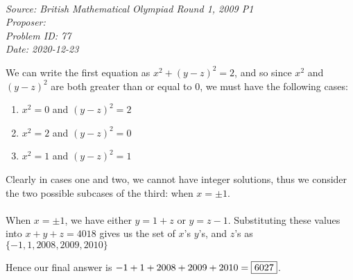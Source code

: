 \SSbreak\\
\emph{Source: British Mathematical Olympiad Round 1, 2009 P1}\\
\emph{Proposer: \Pss}\\
\emph{Problem ID: 77}\\
\emph{Date: 2020-12-23}\\
\SSbreak

\bigskip

\begin{solution}\hfil\medskip

We can write the first equation as \(x^2+(y-z)^2=2\), and so since \(x^2\) and \((y-z)^2\) are both greater than or equal to 0, we must have the following cases:

\begin{enumerate}
    \item \(x^2=0\) and \((y-z)^2=2\)
    \item \(x^2=2\) and \((y-z)^2=0\)
    \item \(x^2=1\) and \((y-z)^2=1\)
\end{enumerate}

Clearly in cases one and two, we cannot have integer solutions, thus we consider the two possible subcases of the third: when \(x=\pm 1\). \\ \\

When \(x=\pm1\), we have either \(y=1+z\) or \(y=z-1\). Substituting these values into \(x+y+z=4018\) gives us the set of \(x\)'s \(y\)'s, and \(z\)'s as \(\{-1,1,2008,2009,2010\}\)

Hence our final answer is \(-1+1+2008+2009+2010=\fbox{6027}\).
\end{solution}\bigskip